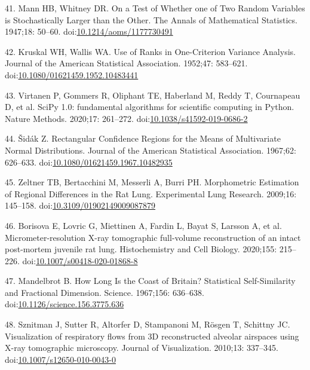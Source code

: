 \documentclass[
  american,
]{article}
\newenvironment{cslreferences}%
  {}%
  {\par}
\begin{document}
\begin{cslreferences}
\leavevmode\hypertarget{ref-MyzxBJ57}{}%
41. Mann HB, Whitney DR. On a Test of Whether one of Two Random Variables is Stochastically Larger than the Other. The Annals of Mathematical Statistics. 1947;18: 50--60. doi:\href{https://doi.org/10.1214/aoms/1177730491}{10.1214/aoms/1177730491}

\leavevmode\hypertarget{ref-ON1Bppkk}{}%
42. Kruskal WH, Wallis WA. Use of Ranks in One-Criterion Variance Analysis. Journal of the American Statistical Association. 1952;47: 583--621. doi:\href{https://doi.org/10.1080/01621459.1952.10483441}{10.1080/01621459.1952.10483441}

\leavevmode\hypertarget{ref-8Miti2Gz}{}%
43. Virtanen P, Gommers R, Oliphant TE, Haberland M, Reddy T, Cournapeau D, et al. SciPy 1.0: fundamental algorithms for scientific computing in Python. Nature Methods. 2020;17: 261--272. doi:\href{https://doi.org/10.1038/s41592-019-0686-2}{10.1038/s41592-019-0686-2}

\leavevmode\hypertarget{ref-GtCynqsI}{}%
44. Šidák Z. Rectangular Confidence Regions for the Means of Multivariate Normal Distributions. Journal of the American Statistical Association. 1967;62: 626--633. doi:\href{https://doi.org/10.1080/01621459.1967.10482935}{10.1080/01621459.1967.10482935}

\leavevmode\hypertarget{ref-I9TmP6IU}{}%
45. Zeltner TB, Bertacchini M, Messerli A, Burri PH. Morphometric Estimation of Regional Differences in the Rat Lung. Experimental Lung Research. 2009;16: 145--158. doi:\href{https://doi.org/10.3109/01902149009087879}{10.3109/01902149009087879}

\leavevmode\hypertarget{ref-Zv1XcgAO}{}%
46. Borisova E, Lovric G, Miettinen A, Fardin L, Bayat S, Larsson A, et al. Micrometer-resolution X-ray tomographic full-volume reconstruction of an intact post-mortem juvenile rat lung. Histochemistry and Cell Biology. 2020;155: 215--226. doi:\href{https://doi.org/10.1007/s00418-020-01868-8}{10.1007/s00418-020-01868-8}

\leavevmode\hypertarget{ref-AdXhaEV4}{}%
47. Mandelbrot B. How Long Is the Coast of Britain? Statistical Self-Similarity and Fractional Dimension. Science. 1967;156: 636--638. doi:\href{https://doi.org/10.1126/science.156.3775.636}{10.1126/science.156.3775.636}

\leavevmode\hypertarget{ref-eioib1TQ}{}%
48. Sznitman J, Sutter R, Altorfer D, Stampanoni M, Rösgen T, Schittny JC. Visualization of respiratory flows from 3D reconstructed alveolar airspaces using X-ray tomographic microscopy. Journal of Visualization. 2010;13: 337--345. doi:\href{https://doi.org/10.1007/s12650-010-0043-0}{10.1007/s12650-010-0043-0}


\end{cslreferences}
\end{document}
